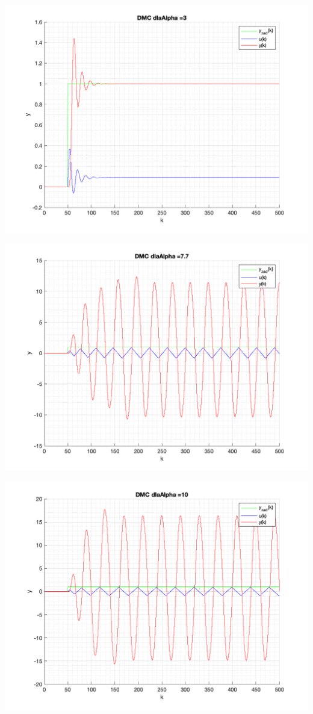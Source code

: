 \documentclass[a4paper, 11pt]{article}
\begin{document}
\begin{enumerate}
 \includegraphics[width=\linewidth]{./ModelsDodatkowe_Alpha/P4_DMC_Alpha_3_png.png} 
 
 \includegraphics[width=\linewidth]{./ModelsDodatkowe_Alpha/P4_DMC_Alpha_7_7_png.png} 
 
 \includegraphics[width=\linewidth]{./ModelsDodatkowe_Alpha/P4_DMC_Alpha_10_png.png} 
 

\end{enumerate}
\end{document}
